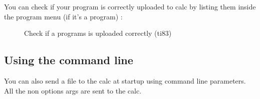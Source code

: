 \documentclass[10pt]{report}
\begin{document}
You can check if your program is correctly uploaded to calc by listing them inside the program menu (if it's a program) :
\begin{figure}[H]
\centering
{}
\caption{Check if a programs is uploaded correctly (ti83)}
\end{figure}

\subsection{Using the command line}

You can also send a file to the calc at startup using command line parameters.\newline
All the non options args are sent to the calc.\newline
\end{document}
